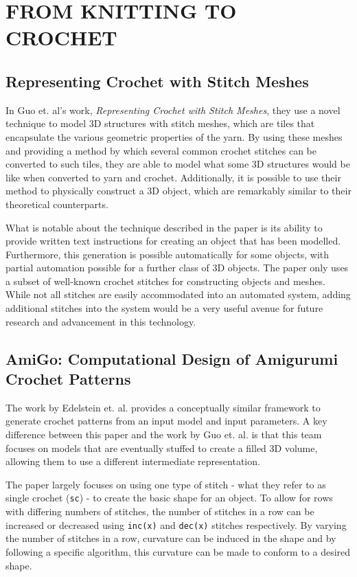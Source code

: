 \documentclass{IEEEcsmag}
\begin{document}
\section{FROM KNITTING TO CROCHET}

\subsection{Representing Crochet with Stitch Meshes}

In Guo et. al's work, \textit{Representing Crochet with Stitch Meshes}, they use a novel technique to model 3D structures with stitch meshes, which are tiles that encapsulate the various geometric properties of the yarn. By using these meshes and providing a method by which several common crochet stitches can be converted to such tiles, they are able to model what some 3D structures would be like when converted to yarn and crochet. Additionally, it is possible to use their method to physically construct a 3D object, which are remarkably similar to their theoretical counterparts. 

What is notable about the technique described in the paper is its ability to provide written text instructions for creating an object that has been modelled. Furthermore, this generation is possible automatically for some objects, with partial automation possible for a further class of 3D objects. The paper only uses a subset of well-known crochet stitches for constructing objects and meshes. While not all stitches are easily accommodated into an automated system, adding additional stitches into the system would be a very useful avenue for future research and advancement in this technology. 

\subsection{AmiGo: Computational Design of Amigurumi Crochet Patterns}

The work by Edelstein et. al. provides a conceptually similar framework to generate crochet patterns from an input model and input parameters. A key difference between this paper and the work by Guo et. al. is that this team focuses on models that are eventually stuffed to create a filled 3D volume, allowing them to use a different intermediate representation. 

The paper largely focuses on using one type of stitch - what they refer to as single crochet (\verb|sc|) - to create the basic shape for an object. To allow for rows with differing numbers of stitches, the number of stitches in a row can be increased or decreased using \verb|inc(x)| and \verb|dec(x)| stitches respectively. By varying the number of stitches in a row, curvature can be induced in the shape and by following a specific algorithm, this curvature can be made to conform to a desired shape. 
\end{document}
